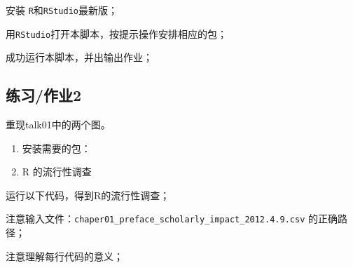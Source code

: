 \documentclass[
]{ctexart}
\begin{document}
安装 \texttt{R}和\texttt{RStudio}最新版；

用\texttt{RStudio}打开本脚本，按提示操作安排相应的包；

成功运行本脚本，并出输出作业；

\hypertarget{ux7ec3ux4e60ux4f5cux4e1a2}{%
\subsection{练习/作业2}\label{ux7ec3ux4e60ux4f5cux4e1a2}}

重现talk01中的两个图。

\begin{enumerate}
\def\labelenumi{\arabic{enumi}.}
\item
  安装需要的包：
\item
  R 的流行性调查
\end{enumerate}

运行以下代码，得到R的流行性调查；

注意输入文件：\texttt{chaper01\_preface\_scholarly\_impact\_2012.4.9.csv}
的正确路径；

注意理解每行代码的意义；
\end{document}
